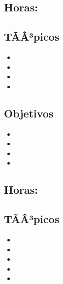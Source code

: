 \subsection{\DSCUATRODef}\label{sec:BOK-DS4}
\subsection*{Horas: \DSCUATROHours}

\subsection*{TÃÂ³picos}
\begin{itemize}
	\item \DSCUATROTopicArgumentos
	\item \DSCUATROTopicPrincipio
	\item \DSCUATROTopicPermutaciones
	\item \DSCUATROTopicSolucion
\end{itemize}

\subsection*{Objetivos}
\begin{itemize}
	\item \DSCUATROObjUNO
	\item \DSCUATROObjDOS
	\item \DSCUATROObjTRES
	\item \DSCUATROObjCUATRO
\end{itemize}

\subsection{\DSCINCODef}\label{sec:BOK-DS5}
\subsection*{Horas: \DSCINCOHours}

\subsection*{TÃÂ³picos}
\begin{itemize}
	\item \DSCINCOTopicArboles
	\item \DSCINCOTopicGrafos
	\item \DSCINCOTopicGrafosdirigidos
	\item \DSCINCOTopicArbolesde
	\item \DSCINCOTopicEstrategias
\end{itemize}

